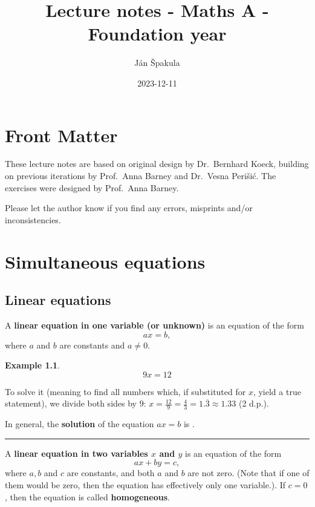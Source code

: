 \documentclass[
  12pt,
  oneside]{book}
\title{Lecture notes - Maths A - Foundation year}
\author{Ján Špakula}
\date{2023-12-11}
\theoremstyle{definition}
\theoremstyle{definition}
\newtheorem{example}{Example}[chapter]
\theoremstyle{definition}
\theoremstyle{definition}
\theoremstyle{remark}
\begin{document}
\maketitle

{
\setcounter{tocdepth}{1}
\tableofcontents
}
\chapter*{Front Matter}\label{front-matter}

These lecture notes are based on original design by Dr.~Bernhard Koeck, building on previous iterations by Prof.~Anna Barney and Dr.~Vesna Perišić. The exercises were designed by Prof.~Anna Barney.

Please let the author know if you find any errors, misprints and/or inconsistencies.

\chapter{Simultaneous equations}\label{simeq}

\section{Linear equations}\label{linear-equations}

A \textbf{linear equation in one variable (or unknown)} is an equation of the form
\[ax=b,\]
where \(a\) and \(b\) are constants and \(a\neq 0\).

\begin{example}
\protect\hypertarget{exm:unnamed-chunk-3}{}\label{exm:unnamed-chunk-3}\[9x=12\]
\end{example}

To solve it (meaning to find all numbers which, if substituted for \(x\), yield a true statement), we divide both sides by \(9\): \(x = \frac{12}{9} = \frac{4}{3} = 1.\overline{3} \approx 1.33\) (2 d.p.).

In general, the \textbf{solution} of the equation \(ax=b\) is .

\begin{center}\rule{0.5\linewidth}{0.5pt}\end{center}

A \textbf{linear equation in two variables \(x\) and \(y\)} is an equation of the form
\[ax+by=c,\]
where \(a,b\) and \(c\) are constants, and both \(a\) and \(b\) are not zero. (Note that if one of them would be zero, then the equation has effectively only one variable.). If \(c=0\), then the equation is called \textbf{homogeneous}.
\end{document}
